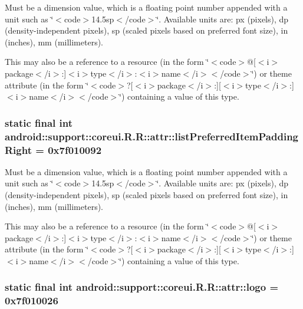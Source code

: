 Must be a dimension value, which is a floating point number appended with a unit such as \char`\"{}$<$code$>$14.5sp$<$/code$>$\char`\"{}. Available units are: px (pixels), dp (density-independent pixels), sp (scaled pixels based on preferred font size), in (inches), mm (millimeters). 

This may also be a reference to a resource (in the form \char`\"{}$<$code$>$@\mbox{[}$<$i$>$package$<$/i$>$:\mbox{]}$<$i$>$type$<$/i$>$:$<$i$>$name$<$/i$>$$<$/code$>$\char`\"{}) or theme attribute (in the form \char`\"{}$<$code$>$?\mbox{[}$<$i$>$package$<$/i$>$:\mbox{]}\mbox{[}$<$i$>$type$<$/i$>$:\mbox{]}$<$i$>$name$<$/i$>$$<$/code$>$\char`\"{}) containing a value of this type. \hypertarget{classandroid_1_1support_1_1coreui_1_1_r_1_1attr_0c59403b8fad209c6b37a8ddee0afdd3}{
\subsubsection[{listPreferredItemPaddingRight}]{\setlength{\rightskip}{0pt plus 5cm}static final int android::support::coreui.R.R::attr::listPreferredItemPaddingRight = 0x7f010092}}
\label{classandroid_1_1support_1_1coreui_1_1_r_1_1attr_0c59403b8fad209c6b37a8ddee0afdd3}


Must be a dimension value, which is a floating point number appended with a unit such as \char`\"{}$<$code$>$14.5sp$<$/code$>$\char`\"{}. Available units are: px (pixels), dp (density-independent pixels), sp (scaled pixels based on preferred font size), in (inches), mm (millimeters). 

This may also be a reference to a resource (in the form \char`\"{}$<$code$>$@\mbox{[}$<$i$>$package$<$/i$>$:\mbox{]}$<$i$>$type$<$/i$>$:$<$i$>$name$<$/i$>$$<$/code$>$\char`\"{}) or theme attribute (in the form \char`\"{}$<$code$>$?\mbox{[}$<$i$>$package$<$/i$>$:\mbox{]}\mbox{[}$<$i$>$type$<$/i$>$:\mbox{]}$<$i$>$name$<$/i$>$$<$/code$>$\char`\"{}) containing a value of this type. \hypertarget{classandroid_1_1support_1_1coreui_1_1_r_1_1attr_a511890f7cdfaf965c5174d82b092296}{
\subsubsection[{logo}]{\setlength{\rightskip}{0pt plus 5cm}static final int android::support::coreui.R.R::attr::logo = 0x7f010026}}
\label{classandroid_1_1support_1_1coreui_1_1_r_1_1attr_a511890f7cdfaf965c5174d82b092296}


